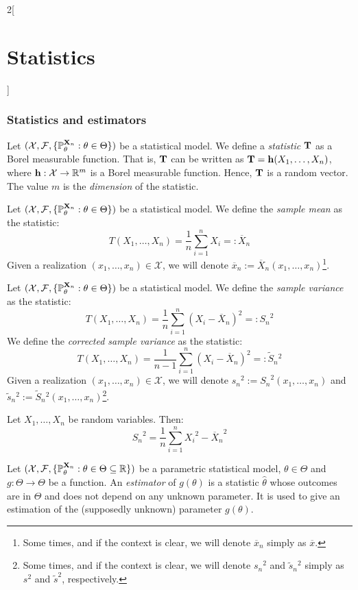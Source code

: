 \documentclass[../../../main.tex]{subfiles}
\begin{document}
\begin{multicols}{2}[\section{Statistics}]
  \subsubsection{Statistics and estimators}
  \begin{definition}[Statistic]
    Let $(\mathcal{X},\mathcal{F},\{\mathbb{P}_\theta^{\boldsymbol{\mathrm{X}}_n}:\theta\in\Theta\})$ be a statistical model. We define a \emph{statistic} $\boldsymbol{\mathrm{T}}$ as a Borel measurable function. That is, $\boldsymbol{\mathrm{T}}$ can be written as $\boldsymbol{\mathrm{T}}=\boldsymbol{\mathrm{h}}(X_1,\ldots,X_n)$, where $\boldsymbol{\mathrm{h}}:\mathcal{X}\rightarrow\mathbb{R}^m$ is a Borel measurable function. Hence, $\boldsymbol{\mathrm{T}}$ is a random vector. The value $m$ is the \emph{dimension} of the statistic.
  \end{definition}
  \begin{definition}
    Let $(\mathcal{X},\mathcal{F},\{\mathbb{P}_\theta^{\boldsymbol{\mathrm{X}}_n}:\theta\in\Theta\})$ be a statistical model. We define the \emph{sample mean} as the statistic: $$T(X_1,\ldots,X_n)=\frac{1}{n}\sum_{i=1}^nX_i=:\overline{X}_n$$
    Given a realization $(x_1,\ldots,x_n)\in\mathcal{X}$, we will denote $\overline{x}_n:=\overline{X}_n(x_1,\ldots,x_n)$\footnote{Some times, and if the context is clear, we will denote $\overline{x}_n$ simply as $\overline{x}$.}.
  \end{definition}
  \begin{definition}
    Let $(\mathcal{X},\mathcal{F},\{\mathbb{P}_\theta^{\boldsymbol{\mathrm{X}}_n}:\theta\in\Theta\})$ be a statistical model. We define the \emph{sample variance} as the statistic: $$T(X_1,\ldots,X_n)=\frac{1}{n}\sum_{i=1}^n{(X_i-\overline{X}_n)}^2=:{S_n}^2$$ We define the \emph{corrected sample variance} as the statistic:
    $$T(X_1,\ldots,X_n)=\frac{1}{n-1}\sum_{i=1}^n{(X_i-\overline{X}_n)}^2=:\tilde{S}_n{}^2$$
    Given a realization $(x_1,\ldots,x_n)\in\mathcal{X}$, we will denote ${s_n}^2:={S_n}^2(x_1,\ldots,x_n)$ and $\tilde{s}_n{}^2:=\tilde{S}_n{}^2(x_1,\ldots,x_n)$\footnote{Some times, and if the context is clear, we will denote ${s_n}^2$ and $\tilde{s}_n{}^2$ simply as $s^2$ and $\tilde{s}^2$, respectively.}.
  \end{definition}
  \begin{proposition}
    Let $X_1,\ldots,X_n$ be random variables. Then: $${S_n}^2=\frac{1}{n}\sum_{i=1}^n{X_i}^2-{\overline{X}_n}^2$$
  \end{proposition}
  \begin{definition}
    Let $(\mathcal{X},\mathcal{F},\{\mathbb{P}_{\theta}^{\boldsymbol{\mathrm{X}}_n}:{\theta}\in\Theta\subseteq \mathbb{R}\})$ be a parametric statistical model, ${\theta} \in\Theta$ and $g:\Theta\rightarrow\Theta$ be a function. An \emph{estimator} of $g({\theta})$ is a statistic ${\hat\theta}$ whose outcomes are in $\Theta$ and does not depend on any unknown parameter. It is used to give an estimation of the (supposedly unknown) parameter $g({\theta})$.
  \end{definition}

\end{multicols}
\end{document}
